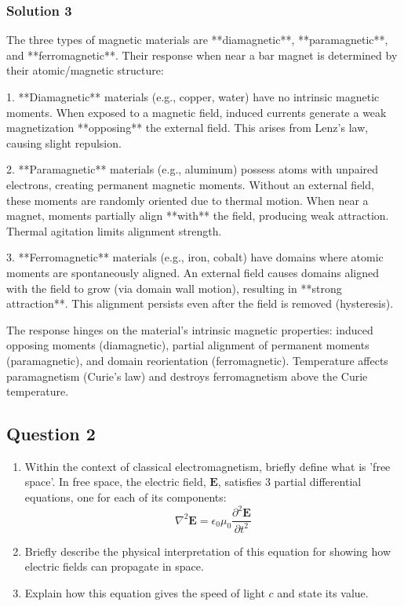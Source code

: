 \documentclass{article}
\begin{document}
\subsubsection{Solution 3}
The three types of magnetic materials are **diamagnetic**, **paramagnetic**, and **ferromagnetic**. Their response when near a bar magnet is determined by their atomic/magnetic structure:

1. **Diamagnetic** materials (e.g., copper, water) have no intrinsic magnetic moments. When exposed to a magnetic field, induced currents generate a weak magnetization **opposing** the external field. This arises from Lenz's law, causing slight repulsion.

2. **Paramagnetic** materials (e.g., aluminum) possess atoms with unpaired electrons, creating permanent magnetic moments. Without an external field, these moments are randomly oriented due to thermal motion. When near a magnet, moments partially align **with** the field, producing weak attraction. Thermal agitation limits alignment strength.

3. **Ferromagnetic** materials (e.g., iron, cobalt) have domains where atomic moments are spontaneously aligned. An external field causes domains aligned with the field to grow (via domain wall motion), resulting in **strong attraction**. This alignment persists even after the field is removed (hysteresis).

The response hinges on the material's intrinsic magnetic properties: induced opposing moments (diamagnetic), partial alignment of permanent moments (paramagnetic), and domain reorientation (ferromagnetic). Temperature affects paramagnetism (Curie's law) and destroys ferromagnetism above the Curie temperature.

\subsection{Question 2}
\begin{enumerate}
    \item Within the context of classical electromagnetism, briefly define what is 'free space'. In free space, the electric field, $\mathbf{E}$, satisfies 3 partial differential equations, one for each of its components:
    \[
    \nabla^2 \mathbf{E} = \epsilon_0 \mu_0 \frac{\partial^2 \mathbf{E}}{\partial t^2}
    \]
    \item Briefly describe the physical interpretation of this equation for showing how electric fields can propagate in space.
    \item Explain how this equation gives the speed of light $c$ and state its value.
\end{enumerate}
\end{document}

